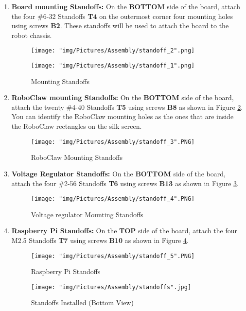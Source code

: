 \documentclass[12pt]{article}
\begin{document}
\begin{enumerate}
\item \textbf{Board mounting Standoffs:} On the \textbf{BOTTOM} side of the board, attach the four \#6-32 Standoffs \textbf{T4} on the outermost corner four mounting holes using screws \textbf{B2}.  These standoffs will be used to attach the board to the robot chassis.

\begin{figure}[H]
  \centering
  \begin{minipage}[b]{0.45\textwidth}
    \texttt{[image: "img/Pictures/Assembly/standoff\_2".png]}
  \end{minipage}
  \hfill
  \begin{minipage}[b]{0.45\textwidth}
    \texttt{[image: "img/Pictures/Assembly/standoff\_1".png]}
  \end{minipage}
  \caption{Mounting Standoffs}
  \label{standoffs_1}
\end{figure}

\item \textbf{RoboClaw mounting Standoffs:} On the \textbf{BOTTOM} side of the board, attach the twenty \#4-40 Standoffs \textbf{T5} using screws \textbf{B8} as shown in Figure \ref{standoffs_2}. You can identify the RoboClaw mounting holes as the ones that are inside the RoboClaw rectangles on the silk screen.


\begin{figure}[H]
	\centering
	\texttt{[image: "img/Pictures/Assembly/standoff\_3".PNG]}
  \caption{RoboClaw Mounting Standoffs}
  \label{standoffs_2}
\end{figure}

\item \textbf{Voltage Regulator Standoffs:} On the \textbf{BOTTOM} side of the board, attach the four \#2-56 Standoffs \textbf{T6} using screws \textbf{B13} as shown in Figure \ref{standoffs_3}. 

\begin{figure}[H]
	\centering
	\texttt{[image: "img/Pictures/Assembly/standoff\_4".PNG]}
  \caption{Voltage regulator Mounting Standoffs}
  \label{standoffs_3}
\end{figure}

\item \textbf{Raspberry Pi  Standoffs:} On the \textbf{TOP} side of the board, attach the four M2.5 Standoffs \textbf{T7} using screws \textbf{B10} as shown in Figure \ref{standoffs_4}. 

\begin{figure}[H]
	\centering
	\texttt{[image: "img/Pictures/Assembly/standoff\_5".PNG]}
  \caption{Raspberry Pi Standoffs}
  \label{standoffs_4}
\end{figure}

\begin{figure}[H]
	\centering
	\texttt{[image: "img/Pictures/Assembly/standoffs".jpg]}
	\caption{Standoffs Installed (Bottom View)}
\end{figure}


\end{enumerate}
\end{document}
